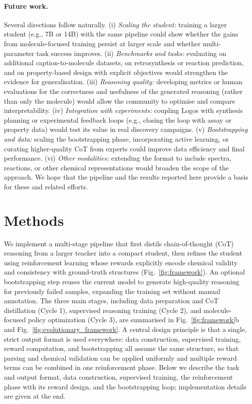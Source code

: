 \documentclass[11pt]{article}
\begin{document}
\paragraph{Future work.}
Several directions follow naturally. (i) \emph{Scaling the student:} training a larger student (e.g., 7B or 14B) with the same pipeline could show whether the gains from molecule-focused training persist at larger scale and whether multi-parameter task success improves. (ii) \emph{Benchmarks and tasks:} evaluating on additional caption-to-molecule datasets, on retrosynthesis or reaction prediction, and on property-based design with explicit objectives would strengthen the evidence for generalisation. (iii) \emph{Reasoning quality:} developing metrics or human evaluations for the correctness and usefulness of the generated reasoning (rather than only the molecule) would allow the community to optimise and compare interpretability. (iv) \emph{Integration with experiments:} coupling Logos with synthesis planning or experimental feedback loops (e.g., closing the loop with assay or property data) would test its value in real discovery campaigns. (v) \emph{Bootstrapping and data:} scaling the bootstrapping phase, incorporating active learning, or curating higher-quality CoT from experts could improve data efficiency and final performance. (vi) \emph{Other modalities:} extending the format to include spectra, reactions, or other chemical representations would broaden the scope of the approach. We hope that the pipeline and the results reported here provide a basis for these and related efforts.

\section{Methods}

We implement a multi-stage pipeline that first distils chain-of-thought (CoT) reasoning from a larger teacher into a compact student, then refines the student using reinforcement learning whose rewards explicitly encode chemical validity and consistency with ground-truth structures (Fig.~\ref{fig:framework}). An optional bootstrapping step reuses the current model to generate high-quality reasoning for previously failed samples, expanding the training set without manual annotation. The three main stages, including data preparation and CoT distillation (Cycle 1), supervised reasoning training (Cycle 2), and molecule-focused policy optimization (Cycle 3), are summarised in Fig.~\ref{fig:framework}b and Fig.~\ref{fig:evolutionary_framework}. A central design principle is that a single, strict output format is used everywhere: data construction, supervised training, reward computation, and bootstrapping all assume the same structure, so that parsing and chemical validation can be applied uniformly and multiple reward terms can be combined in one reinforcement phase. Below we describe the task and output format, data construction, supervised training, the reinforcement phase with its reward design, and the bootstrapping loop; implementation details are given at the end.
\end{document}
